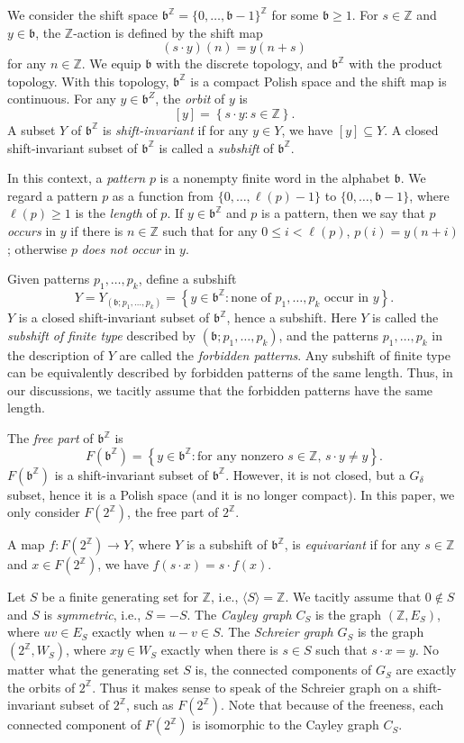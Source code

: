 \documentclass[11pt]{amsart}
\theoremstyle{definition}
\def\Z{\mathbb{Z}}
\def\Z{\mathbb{Z}}
\def\bsft{\mathfrak{b}}
\begin{document}
We consider the shift space $\bsft^\Z=\{0,\dots,\bsft-1\}^\Z$ for some $\bsft\geq 1$. For $s\in \Z$ and $y\in \bsft$, the $\Z$-action is defined by the shift map
$$ (s\cdot y)(n)=y(n+s) $$
for any $n\in\Z$.  We equip $\bsft$ with the discrete topology, and $\bsft^\Z$ with the product topology. With this topology, $\bsft^\Z$ is a compact Polish space and the shift map is continuous. For any $y\in \bsft^Z$, the {\em orbit} of $y$ is 
$$ [y]=\left\{s\cdot y\colon s\in \Z\right\}. $$
A subset $Y$ of $\bsft^\Z$ is {\em shift-invariant} if for any $y\in Y$, we have $[y]\subseteq Y$. A closed shift-invariant subset of $\bsft^\Z$ is called a {\em subshift} of $\bsft^\Z$. 

In this context, a {\em pattern} $p$ is a nonempty finite word in the alphabet $\mathfrak{b}$. We regard a pattern $p$ as a function from $\{0, \dots, \ell(p)-1\}$ to $\{0,\dots, \bsft-1\}$, where $\ell(p)\geq 1$ is the {\em length} of $p$. If $y\in \bsft^\Z$ and $p$ is a pattern, then we say that $p$ {\em occurs} in $y$ if there is $n\in\Z$ such that for any $0\leq i<\ell(p)$, $p(i)=y(n+i)$; otherwise $p$ {\em does not occur} in $y$. 

Given patterns $p_1, \dots, p_k$, define a subshift 
$$ Y=Y_{(\bsft; p_1,\dots,p_k)}=\left\{y\in \bsft^\Z\colon \mbox{none of $p_1,\dots, p_k$ occur in $y$}\right\}. $$
$Y$ is a closed shift-invariant subset of $\bsft^\Z$, hence a subshift. Here $Y$ is called the {\em subshift of finite type} described by $(\bsft; p_1,\dots, p_k)$, and the patterns $p_1,\dots, p_k$ in the description of $Y$ are called the {\em forbidden patterns}. Any subshift of finite type can be equivalently described by forbidden patterns of the same length. Thus, in our discussions, we tacitly assume that the forbidden patterns have the same length.

The {\em free part} of $\bsft^\Z$ is
$$ F(\bsft^\Z)=\left\{y\in \bsft^\Z\colon \mbox{for any nonzero $s\in \Z$, $s\cdot y\neq y$}\right\}. $$
$F(\bsft^\Z)$ is a shift-invariant subset of $\bsft^\Z$. However, it is not closed, but a $G_\delta$ subset, hence it is a Polish space (and it is no longer compact). In this paper, we only consider $F(2^\Z)$, the free part of $2^\Z$.

A map $f\colon F(2^\Z)\to Y$, where $Y$ is a subshift of $\bsft^\Z$, is {\em equivariant} if for any $s\in \Z$ and $x\in F(2^\Z)$, we have $f(s\cdot x)=s\cdot f(x)$. 

Let $S$ be a finite generating set for $\Z$, i.e., $\langle S\rangle=\Z$. We tacitly assume that $0\not\in S$ and $S$ is {\em symmetric}, i.e., $S=-S$. The {\em Cayley graph} $C_S$ is the graph $(\Z, E_S)$, where $uv\in E_S$ exactly when $u-v\in S$. The {\em Schreier graph} $G_S$ is the graph $(2^\Z, W_S)$, where $xy\in W_S$ exactly when there is $s\in S$ such that $s\cdot x=y$. No matter what the generating set $S$ is, the connected components of $G_S$ are exactly the orbits of $2^\Z$. Thus it makes sense to speak of the Schreier graph on a shift-invariant subset of $2^\Z$, such as $F(2^\Z)$. Note that because of the freeness, each connected component of $F(2^\Z)$ is isomorphic to the Cayley graph $C_S$. 
\end{document}
